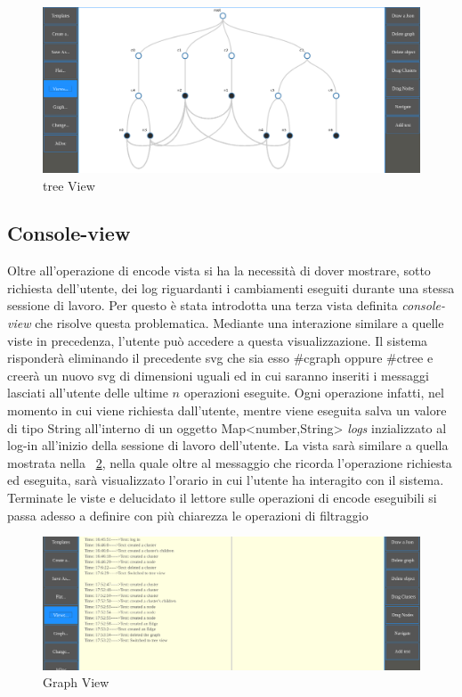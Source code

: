 {\begin{figure}[!htb]
	\begin{center}
		\includegraphics[width=1 \linewidth]{figure/treeView}
	\end{center}
	\caption{tree View\label{fig:treeView}}
\end{figure}
	\subsection{Console-view}
Oltre all'operazione di encode vista si ha la necessità di dover mostrare, sotto richiesta dell'utente, dei log riguardanti i cambiamenti eseguiti durante una stessa sessione di lavoro. Per questo è stata introdotta una terza vista definita \textit{console-view} che risolve questa problematica.
Mediante una interazione similare a quelle viste in precedenza, l'utente può accedere a questa visualizzazione. Il sistema risponderà eliminando il precedente svg che sia esso \#cgraph oppure \#ctree e creerà un nuovo svg di dimensioni uguali ed in cui saranno inseriti i messaggi lasciati all'utente delle ultime $n$ operazioni eseguite. Ogni operazione infatti, nel momento in cui viene richiesta dall'utente, mentre viene eseguita salva un valore di tipo String all'interno di un oggetto Map<number,String> \textit{logs} inzializzato al log-in all'inizio della sessione di lavoro dell'utente.
La vista sarà similare a quella mostrata nella \figurename~\ref{fig:consoleView}, nella quale oltre al messaggio che ricorda l'operazione richiesta ed eseguita, sarà visualizzato l'orario in cui l'utente ha interagito con il sistema. Terminate le viste e delucidato il lettore sulle operazioni di encode eseguibili si passa adesso a definire con più chiarezza le operazioni di filtraggio
\begin{figure}[!htb]
	\begin{center}
		\includegraphics[width=1 \linewidth]{figure/consoleView}
	\end{center}
	\caption{Graph View\label{fig:consoleView}}
\end{figure}
\newpage
}

